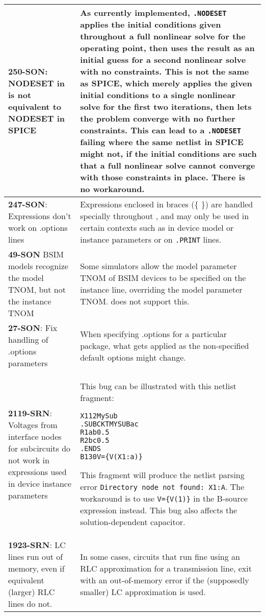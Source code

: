 {\begin{longtable}[h] {>{\raggedright\small}m{2in}|>{\raggedright\let\\\tabularnewline\small}m{3.5in}}
\textbf{250-SON}: NODESET in \Xyce{} is not equivalent to NODESET in SPICE &
As currently implemented, \texttt{.NODESET} applies the initial
conditions given throughout a full nonlinear solve for the operating
point, then uses the result as an initial guess for a second nonlinear
solve with no constraints.  This is not the same as SPICE, which
merely applies the given initial conditions to a single nonlinear
solve for the first two iterations, then lets the problem converge
with no further constraints.  This can lead to
a \Xyce{} \texttt{.NODESET} failing where the same netlist in SPICE
might not, if the initial conditions are such that a full nonlinear
solve cannot converge with those constraints in place.  There is no
workaround.
\\ \hline

\textbf{247-SON}: Expressions don't work on .options lines & Expressions
enclosed in braces (\{ \}) are handled specially throughout \Xyce{},
and may only be used in certain contexts such as in device model or
instance parameters or on \texttt{.PRINT} lines.
\\ \hline


\textbf{49-SON} \Xyce{} BSIM models recognize the model TNOM, but not the
instance TNOM & Some simulators allow the model parameter TNOM of BSIM
devices to be specified on the instance line, overriding the model
parameter TNOM.  \Xyce{} does not support this.
\\ \hline


\textbf{27-SON}: Fix handling of .options parameters &
When specifying .options for a particular package, what gets applied
as the non-specified default options might change.  \\ \hline

\textbf{2119-SRN}: Voltages from interface nodes for subcircuits do not
work in expressions used in device instance parameters & This bug can be
illustrated with this netlist fragment:
\begin{alltt}
X1 1 2 MySub
.SUBCKT MYSUB a c
R1   a b 0.5
R2   b c 0.5
.ENDS
B1 3 0 V=\{V(X1:a)\}
\end{alltt}
This fragment will produce the netlist parsing error \texttt{Directory
node not found: X1:A}.  The workaround is to use \texttt{V=\{V(1)\}}
in the B-source expression instead.  This bug also affects the
solution-dependent capacitor.
\\ \hline

\textbf{1923-SRN}: LC lines run out of memory, even if equivalent (larger) RLC
lines do not. & In some cases, circuits that run fine using an RLC
approximation for a transmission line, exit with an out-of-memory
error if the (supposedly smaller) LC approximation is used.
\\ \hline


\end{longtable}}
